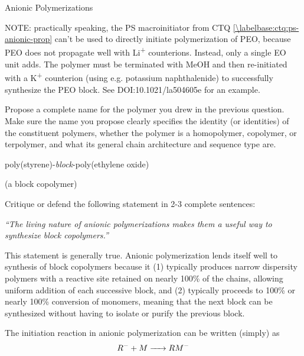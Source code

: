 \begin{activity}{Anionic Polymerizations}
\begin{ctqs}
\begin{solution}[1.75in]
{			NOTE: practically speaking, the PS macroinitiator from CTQ \ref{\labelbase:ctq:ps-anionic-prop} can't be used to directly initiate polymerization of PEO, because PEO does not propagate well with Li\textsuperscript{+} counterions.  Instead, only a single EO unit adds. The polymer must be terminated with MeOH and then re-initiated with a K\textsuperscript{+} counterion (using e.g. potassium naphthalenide) to successfully synthesize the PEO block.  See DOI:10.1021/la504605e for an example.
		}
		\end{solution}
	
	\question Propose a complete name for the polymer you drew in the previous question.  Make sure the name you propose clearly specifies the identity (or identities) of the constituent polymers, whether the polymer is a homopolymer, copolymer, or terpolymer, and what its general chain architecture and sequence type are. 
	
		\begin{solution}[1in]
			poly(styrene)-\emph{block}-poly(ethylene oxide)
			
			(a block copolymer)
		\end{solution}
		
	\question Critique or defend the following statement in 2-3 complete sentences:
	
		\emph{``The living nature of anionic polymerizations makes them a useful way to synthesize block copolymers.''}
		
		\begin{solution}[1.5in]
			This statement is generally true.  Anionic polymerization lends itself well to synthesis of block copolymers because it (1) typically produces narrow dispersity polymers with a reactive site retained on nearly 100\% of the chains, allowing uniform addition of each successive block, and (2) typically proceeds to 100\% or nearly 100\% conversion of monomers, meaning that the next block can be synthesized without having to isolate or purify the previous block.
		\end{solution}
	
\end{ctqs}


\begin{exercises}


	\exercise The initiation reaction in anionic polymerization can be written (simply) as %
		\begin{equation*}
			R^- + M \ce{->} RM^-
		\end{equation*}
		

\end{exercises}
\end{activity}
